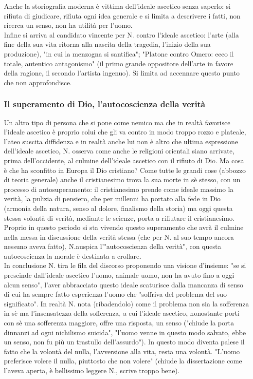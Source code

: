 \documentclass[10pt,a4paper]{article}
\begin{document}
Anche la storiografia moderna è vittima dell'ideale ascetico senza saperlo: si rifiuta di giudicare, rifiuta ogni idea generale e si limita a descrivere i fatti, non ricerca un senso, non ha utilità per l'uomo.\\
Infine si arriva al candidato vincente per N. contro l'ideale ascetico: l'arte (alla fine della sua vita ritorna alla nascita della tragedia, l'inizio della sua produzione), "in cui la menzogna si santifica"; "Platone contro Omero: ecco il totale, autentico antagonismo" (il primo grande oppositore dell'arte in favore della ragione, il secondo l'artista ingenuo). Si limita ad accennare questo punto che non approfondisce.\\
\subsubsection{Il superamento di Dio, l'autocoscienza della verità}
Un altro tipo di persona che si pone come nemico ma che in realtà favorisce l'ideale ascetico è proprio colui che gli va contro in modo troppo rozzo e plateale, l'ateo suscita diffidenza e in realtà anche lui non è altro che ultima espressione dell'ideale ascetico, N. osserva come anche le religioni orientali siano arrivate, prima dell'occidente, al culmine dell'ideale ascetico con il rifiuto di Dio. Ma cosa è che ha sconfitto in Europa il Dio cristiano? Come tutte le grandi cose (abbozzo di teoria generale) anche il cristianesimo trova la sua morte in sè stesso, con un processo di autosuperamento: il cristianesimo prende come ideale massimo la verità, la pulizia di pensiero, che per millenni ha portato alla fede in Dio (armonia della natura, senso al dolore, finalismo della storia) ma oggi questa stessa volontà di verità, mediante le scienze, porta a rifiutare il cristianesimo. Proprio in questo periodo si sta vivendo questo superamento che avrà il culmine nella messa in discussione della verità stessa (che per N. al suo tempo ancora nessuno aveva fatto), N.auspica l'"autocoscienza della verità", con questa autocoscienza la morale è destinata a crollare. \\
In conclusione N. tira le fila del discorso proponendo una visione d'insieme: "se si prescinde dall'ideale ascetico l'uomo, animale uomo, non ha avuto fino a oggi alcun senso", l'aver abbracciato questo ideale scaturisce dalla mancanza di senso di cui ha sempre fatto esperienza l'uomo che "soffriva del problema del suo significato". In realtà N. nota (ribadendolo) come il problema non sia la sofferenza in sè ma l'insensatezza della sofferenza, a cui l'ideale ascetico, nonostante porti con sè una sofferenza maggiore, offre una risposta, un senso ("chiude la porta dinnanzi ad ogni nichilismo suicida", "l'uomo venne in questo modo salvato, ebbe un senso, non fu più un trastullo dell'assurdo"). In questo modo diventa palese il fatto che la volontà del nulla, l'avversione alla vita, resta una volontà. "L'uomo preferisce volere il nulla, piuttosto che non volere" (chiude la dissertazione come l'aveva aperta, è bellissimo leggere N., scrive troppo bene).
\end{document}
